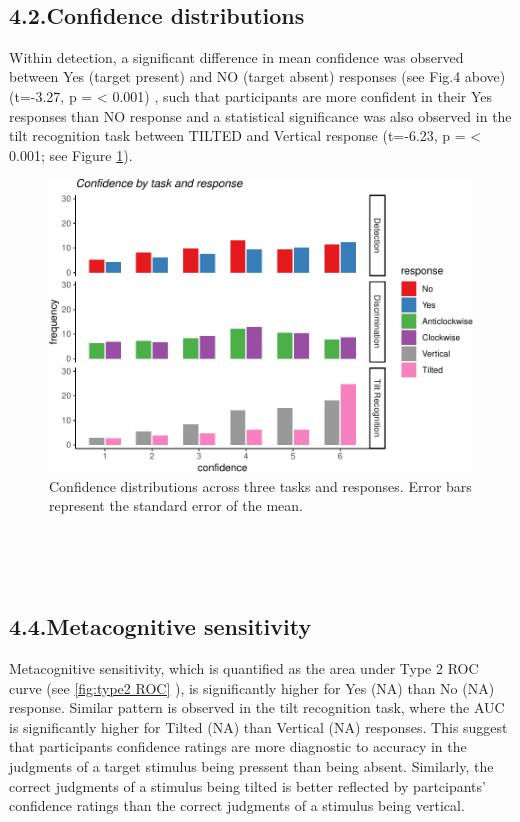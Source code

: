 \documentclass[
]{article}
\begin{document}
~

\hypertarget{confidence-distributions}{%
\subsection{4.2.Confidence
distributions}\label{confidence-distributions}}

Within detection, a significant difference in mean confidence was
observed between Yes (target present) and NO (target absent) responses
(see Fig.4 above) (t=-3.27, p = \textless{} 0.001) , such that
participants are more confident in their Yes responses than NO response
and a statistical significance was also observed in the tilt recognition
task between TILTED and Vertical response (t=-6.23, p = \textless{}
0.001; see Figure \ref{fig:confidence}).

\begin{figure}
\centering
\includegraphics{Chudi-Thesis-2020_files/figure-latex/unnamed-chunk-4-1.pdf}
\caption{\label{fig:confidence} Confidence distributions across three
tasks and responses. Error bars represent the standard error of the
mean.}
\end{figure}

~

~

\hypertarget{metacognitive-sensitivity}{%
\subsection{4.4.Metacognitive
sensitivity}\label{metacognitive-sensitivity}}

Metacognitive sensitivity, which is quantified as the area under Type 2
ROC curve (see \ref{fig:type2 ROC} ), is significantly higher for Yes
(NA) than No (NA) response. Similar pattern is observed in the tilt
recognition task, where the AUC is significantly higher for Tilted (NA)
than Vertical (NA) responses. This suggest that participants confidence
ratings are more diagnostic to accuracy in the judgments of a target
stimulus being pressent than being absent. Similarly, the correct
judgments of a stimulus being tilted is better reflected by partcipants'
confidence ratings than the correct judgments of a stimulus being
vertical.
\end{document}
